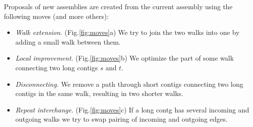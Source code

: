 Proposals of new assemblies are created from the current assembly
using the following moves (and more others):
\begin{itemize}
\item \emph{Walk extension.} (Fig.\ref{fig:moves}a)
  We try to join the two walks into one by adding a small walk between them.
\item \emph{Local improvement.} (Fig.\ref{fig:moves}b)
  We optimize the
  part of some walk connecting two long contigs $s$ and $t$.
\item \emph{Disconnecting.} We remove a path through short contigs 
  connecting two long contigs in the same walk, resulting in two
  shorter walks.
\item \emph{Repeat interchange.} (Fig.\ref{fig:moves}c) 
  If a long contg has several incoming and outgoing walks
  we try to swap pairing of incoming and outgoing edges.
\end{itemize}

